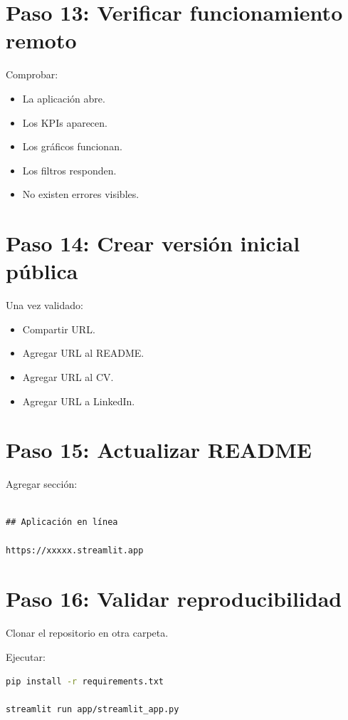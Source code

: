 \section{Paso 13: Verificar funcionamiento remoto}

Comprobar:

\begin{itemize}
\item La aplicación abre.
\item Los KPIs aparecen.
\item Los gráficos funcionan.
\item Los filtros responden.
\item No existen errores visibles.
\end{itemize}

\section{Paso 14: Crear versión inicial pública}

Una vez validado:

\begin{itemize}
\item Compartir URL.
\item Agregar URL al README.
\item Agregar URL al CV.
\item Agregar URL a LinkedIn.
\end{itemize}

\section{Paso 15: Actualizar README}

Agregar sección:

\begin{verbatim}

## Aplicación en línea

https://xxxxx.streamlit.app
\end{verbatim}

\section{Paso 16: Validar reproducibilidad}

Clonar el repositorio en otra carpeta.

Ejecutar:

\begin{lstlisting}[language=bash]
pip install -r requirements.txt

streamlit run app/streamlit_app.py
\end{lstlisting}

